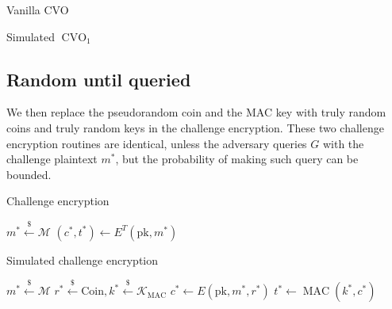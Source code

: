 \documentclass{article}
\newcommand{\leftsample}{\overset{{\scriptscriptstyle\$}}{\leftarrow}}
\begin{document}
\begin{multicols}{2}
    \begin{algorithm}[H]
        \SetAlgoLined
        \caption{Vanilla CVO}
    \end{algorithm}

    \columnbreak

    \begin{algorithm}[H]
        \SetAlgoLined
        \caption{Simulated $\operatorname{CVO}_1$}
        \Return{$\bot$}
    \end{algorithm}
\end{multicols}

\subsection{Random until queried}\label{random-until-queried}
We then replace the pseudorandom coin and the MAC key with truly random coins and truly random keys in the challenge encryption. These two challenge encryption routines are identical, unless the adversary queries $G$ with the challenge plaintext $m^\ast$, but the probability of making such query can be bounded.

\begin{multicols}{2}
    \begin{algorithm}[H]
        \SetAlgoLined
        \caption{Challenge encryption}
        $m^\ast \leftsample \mathcal{M}$\;
        $(c^\ast, t^\ast) \leftarrow E^T(\text{pk}, m^\ast)$\;
    \end{algorithm}

    \begin{algorithm}[H]
        \SetAlgoLined
        \caption{Simulated challenge encryption}
        $m^\ast \leftsample \mathcal{M}$\;
        $r^\ast \leftsample \text{Coin}, k^\ast \leftsample \mathcal{K}_\text{MAC}$\;
        $c^\ast \leftarrow E(\text{pk}, m^\ast, r^\ast)$\;
        $t^\ast \leftarrow \operatorname{MAC}(k^\ast, c^\ast)$
    \end{algorithm}
\end{multicols}
\end{document}
